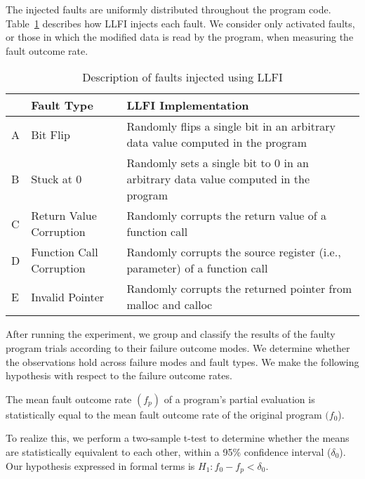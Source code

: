 The injected faults are uniformly distributed throughout the program code.
Table~\ref{tab:faulttypes} describes how LLFI injects each fault.
We consider only activated faults, or those in which the modified data is read by the program, when measuring the fault outcome rate.


\begin{table}[htbp]
\small{
\begin{center}
    \begin{tabular}{|p{0.1cm}|p{2.4cm}|p{5cm}|}
    \hline
     & \textbf{Fault Type} & \textbf{LLFI Implementation} \\ \hline
    A & Bit Flip & Randomly flips a single bit in an arbitrary data value computed in the program  \\ \hline
    B & Stuck at 0 & Randomly sets a single bit to 0 in an arbitrary data value computed in the program  \\ \hline
    C & Return Value Corruption & Randomly corrupts the return value of a function call \\ \hline
    D & Function Call Corruption & Randomly corrupts the source register (i.e., parameter) of a function call \\ \hline
    E & Invalid Pointer & Randomly corrupts the returned pointer from malloc and calloc\\ \hline
    \hline
    \end{tabular}
    \end{center}
    }
    \caption{Description of faults injected using LLFI}
    \label{tab:faulttypes}
\end{table}
 

After running the experiment, we group and classify the results of the faulty program trials according to their failure outcome modes.
We determine whether the observations hold across failure modes and fault types. 
We make the following hypothesis with respect to the failure outcome rates.

\begin{hyp}
  \label{hyp:hypothesis}
The mean fault outcome rate $(f_p)$ of a program's partial evaluation is statistically equal to the mean fault outcome rate of the original program $(f_0$).
\end{hyp}

To realize this, we perform a two-sample t-test to determine whether the means are statistically equivalent to each other, within a 95\% confidence interval ($\delta_0$).
Our hypothesis expressed in formal terms is $H_1: f_0 - f_p < \delta_0 $.


